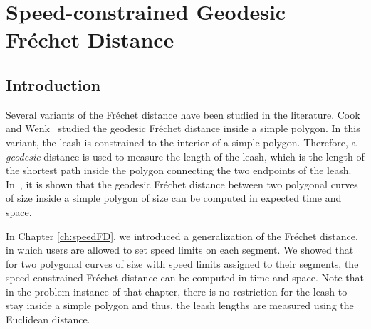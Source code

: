 \documentclass[12pt]{dalthesis}
\newcommand{\REM}[1]{}
\newcommand{\Frechet}{Fr\'echet }
\begin{document}
\clearpage{}\chapter{Speed-constrained Geodesic \Frechet Distance }
\label{ch:speed-geodesic}

\REM{
Given two polygonal curves inside a simple polygon,
we study the problem of finding the \Frechet distance between the two curves
under the following two conditions
(i) the distance between two points on the curves is measured as the length of the shortest path
between them lying inside the simple polygon, and 
(ii) the traversal along each segment of the polygonal curves 
is restricted to be between a minimum and a maximum permissible speed
assigned to that segment.

We provide an algorithm that decides in  time 
whether the speed-constrained geodesic \Frechet distance between two polygonal curves inside a 
simple polygon is within a given value , 
where  is the number of segments in the curves, and  is the complexity of the polygon. 
This leads to an algorithm for solving this variant of the \Frechet distance exactly
in  time and  space.
}





\section{Introduction} \label{sec:intro}




Several variants of the \Frechet distance have been studied in the literature.
Cook and Wenk~\cite{WenkC08a} studied  
the geodesic \Frechet distance inside a simple polygon.
In this variant, the leash is constrained to the interior of a simple polygon.  
Therefore,
a \emph{geodesic} distance is used to measure the length of the leash, which is 
the length of the shortest path inside the polygon connecting the two endpoints of the leash.
In~\cite{WenkC08a}, it is shown that the geodesic \Frechet distance 
between two polygonal curves of size  inside a simple polygon of size 
can be computed in  expected time and  space. 

In Chapter \ref{ch:speedFD}, we
introduced a generalization of the \Frechet distance,
in which users are allowed to set speed limits on each segment.
We showed that
for two polygonal curves of size  with
speed limits assigned to their segments,
the speed-constrained \Frechet distance 
can be computed in  time and  space. 
Note that in the problem instance of that chapter, there is no restriction for the leash to stay inside a simple polygon 
and thus, the leash lengths are measured using  the Euclidean distance.
\end{document}
